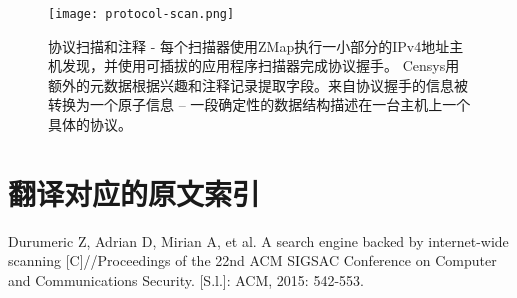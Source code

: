 \begin{figure}[H]
  \centering
  \texttt{[image: protocol-scan.png]}
  \caption{{\heiti 协议扫描和注释} - 每个扫描器使用ZMap执行一小部分的IPv4地址主机发现，并使用可插拔的应用程序扫描器完成协议握手。
  Censys用额外的元数据根据兴趣和注释记录提取字段。来自协议握手的信息被转换为一个原子信息 – 
  一段确定性的数据结构描述在一台主机上一个具体的协议。}
  \label{fig:protocol}
\end{figure}

\section*{翻译对应的原文索引}

\begin{translationbib}
\item Durumeric Z, Adrian D, Mirian A, et al. A search engine backed by internet-wide scanning
[C]//Proceedings of the 22nd ACM SIGSAC Conference on Computer and Communications
Security. [S.l.]: ACM, 2015: 542-553.
\end{translationbib}